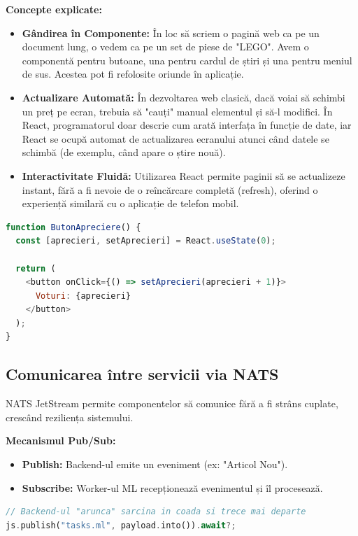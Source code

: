 \documentclass[12pt,a4paper]{article}
\begin{document}
\textbf{Concepte explicate:}
\begin{itemize}
    \item \textbf{Gândirea în Componente:} În loc să scriem o pagină web ca pe un document lung, o vedem ca pe un set de piese de "LEGO". Avem o componentă pentru butoane, una pentru cardul de știri și una pentru meniul de sus. Acestea pot fi refolosite oriunde în aplicație.
    \item \textbf{Actualizare Automată:} În dezvoltarea web clasică, dacă voiai să schimbi un preț pe ecran, trebuia să "cauți" manual elementul și să-l modifici. În React, programatorul doar descrie cum arată interfața în funcție de date, iar React se ocupă automat de actualizarea ecranului atunci când datele se schimbă (de exemplu, când apare o știre nouă).
    \item \textbf{Interactivitate Fluidă:} Utilizarea React permite paginii să se actualizeze instant, fără a fi nevoie de o reîncărcare completă (refresh), oferind o experiență similară cu o aplicație de telefon mobil.
\end{itemize}

\begin{lstlisting}[language=JavaScript, caption=Exemplu de componenta React]
function ButonApreciere() {
  const [aprecieri, setAprecieri] = React.useState(0);

  return (
    <button onClick={() => setAprecieri(aprecieri + 1)}>
      Voturi: {aprecieri}
    </button>
  );
}
\end{lstlisting}

\newpage

\subsection{Comunicarea între servicii via NATS}
NATS JetStream permite componentelor să comunice fără a fi strâns cuplate, crescând reziliența sistemului.

\textbf{Mecanismul Pub/Sub:}
\begin{itemize}
    \item \textbf{Publish:} Backend-ul emite un eveniment (ex: "Articol Nou").
    \item \textbf{Subscribe:} Worker-ul ML recepționează evenimentul și îl procesează.
\end{itemize}

\begin{lstlisting}[language=Rust, caption=Emiterea unui eveniment (Publish)]
// Backend-ul "arunca" sarcina in coada si trece mai departe
js.publish("tasks.ml", payload.into()).await?;
\end{lstlisting}
\end{document}
